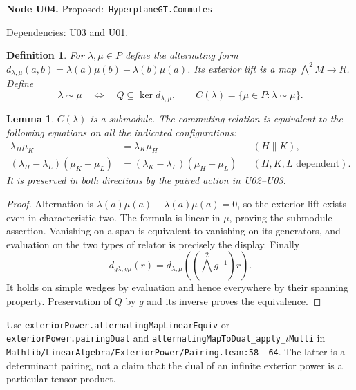 \documentclass[11pt]{article}
\newtheorem{lemma}[theorem]{Lemma}
\newtheorem{definition}[theorem]{Definition}
\theoremstyle{remark}\newtheorem{remark}[theorem]{Remark}
\newcommand{\code}[1]{\nolinkurl{#1}}
\newcommand{\node}[3]{\par\Needspace{8\baselineskip}\smallskip\noindent\textbf{Node #1.}\quad
 \textsf{Proposed:}\ \code{#2}\par\noindent
 \textsf{Dependencies:} #3.\par\smallskip}
\begin{document}
\node{U04}{HyperplaneGT.Commutes}{U03 and U01}
\begin{definition}\label{def:u04}
For $\lambda,\mu\in P$ define the alternating form
$d_{\lambda,\mu}(a,b)=\lambda(a)\mu(b)-\lambda(b)\mu(a)$.
Its exterior lift is a map $\bigwedge^2M\to R$. Define
\[
 \lambda\sim\mu\quad\Longleftrightarrow\quad
 Q\subseteq\ker d_{\lambda,\mu},\qquad
 C(\lambda)=\{\mu\in P:\lambda\sim\mu\}.
\]
\end{definition}
\begin{lemma}\label{lem:u04}
$C(\lambda)$ is a submodule. The commuting relation is equivalent
to the following equations on all the indicated configurations:
\begin{align*}
 \lambda_H\mu_K&=\lambda_K\mu_H&& (H\parallel K),\\
 (\lambda_H-\lambda_L)(\mu_K-\mu_L)
 &=(\lambda_K-\lambda_L)(\mu_H-\mu_L)
 &&(H,K,L\text{ dependent}).
\end{align*}
It is preserved in both directions by the paired action in U02--U03.
\end{lemma}
\begin{proof}
Alternation is $\lambda(a)\mu(a)-\lambda(a)\mu(a)=0$, so the
exterior lift exists even in characteristic two. The formula is
linear in $\mu$, proving the submodule assertion. Vanishing on a
span is equivalent to vanishing on its generators, and evaluation
on the two types of relator is precisely the display. Finally
\[
 d_{g\lambda,g\mu}(r)=d_{\lambda,\mu}((\bigwedge^2g^{-1})r).
\]
It holds on simple wedges by evaluation and hence everywhere by
their spanning property. Preservation of $Q$ by $g$ and its inverse
proves the equivalence.
\end{proof}
Use \code{exteriorPower.alternatingMapLinearEquiv} or
\code{exteriorPower.pairingDual} and
\code{alternatingMapToDual_apply_}$\iota$\code{Multi} in
\code{Mathlib/LinearAlgebra/ExteriorPower/Pairing.lean:58--64}.
The latter is a determinant pairing, not a claim that the dual of
an infinite exterior power is a particular tensor product.
\end{document}
